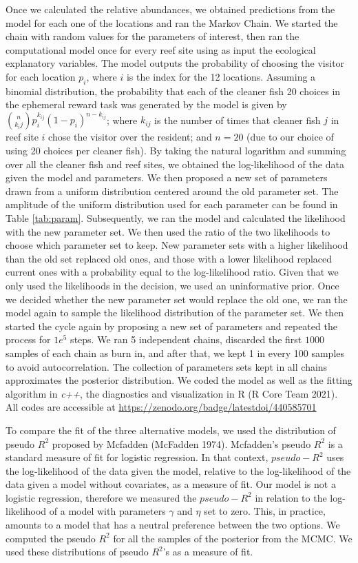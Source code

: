 \documentclass[
  12pt,
]{article}
\begin{document}
Once we calculated the relative abundances, we obtained predictions from
the model for each one of the locations and ran the Markov Chain. We
started the chain with random values for the parameters of interest,
then ran the computational model once for every reef site using as input
the ecological explanatory variables. The model outputs the probability
of choosing the visitor for each location \(p_i\), where \(i\) is the
index for the 12 locations. Assuming a binomial distribution, the
probability that each of the cleaner fish 20 choices in the ephemeral
reward task was generated by the model is given by
\(\binom{n}{k_ij}p^{k_{ij}}_i (1-p_i)^{n-k_{ij}}\); where \(k_{ij}\) is
the number of times that cleaner fish \(j\) in reef site \(i\) chose the
visitor over the resident; and \(n=20\) (due to our choice of using 20
choices per cleaner fish). By taking the natural logarithm and summing
over all the cleaner fish and reef sites, we obtained the log-likelihood
of the data given the model and parameters. We then proposed a new set
of parameters drawn from a uniform distribution centered around the old
parameter set. The amplitude of the uniform distribution used for each
parameter can be found in Table \ref{tab:param}. Subsequently, we ran
the model and calculated the likelihood with the new parameter set. We
then used the ratio of the two likelihoods to choose which parameter set
to keep. New parameter sets with a higher likelihood than the old set
replaced old ones, and those with a lower likelihood replaced current
ones with a probability equal to the log-likelihood ratio. Given that we
only used the likelihoods in the decision, we used an uninformative
prior. Once we decided whether the new parameter set would replace the
old one, we ran the model again to sample the likelihood distribution of
the parameter set. We then started the cycle again by proposing a new
set of parameters and repeated the process for \(1e^5\) steps. We ran 5
independent chains, discarded the first \(1000\) samples of each chain
as burn in, and after that, we kept 1 in every 100 samples to avoid
autocorrelation. The collection of parameters sets kept in all chains
approximates the posterior distribution. We coded the model as well as
the fitting algorithm in \emph{c++}, the diagnostics and visualization
in R (R Core Team 2021). All codes are accessible at
\url{https://zenodo.org/badge/latestdoi/440585701}

To compare the fit of the three alternative models, we used the
distribution of pseudo \(R^2\) proposed by Mcfadden (McFadden 1974).
Mcfadden's pseudo \(R^2\) is a standard measure of fit for logistic
regression. In that context, \(pseudo-R^2\) uses the log-likelihood of
the data given the model, relative to the log-likelihood of the data
given a model without covariates, as a measure of fit. Our model is not
a logistic regression, therefore we measured the \(pseudo-R^2\) in
relation to the log-likelihood of a model with parameters \(\gamma\) and
\(\eta\) set to zero. This, in practice, amounts to a model that has a
neutral preference between the two options. We computed the pseudo
\(R^2\) for all the samples of the posterior from the MCMC. We used
these distributions of pseudo \(R^2\)'s as a measure of fit.
\end{document}
